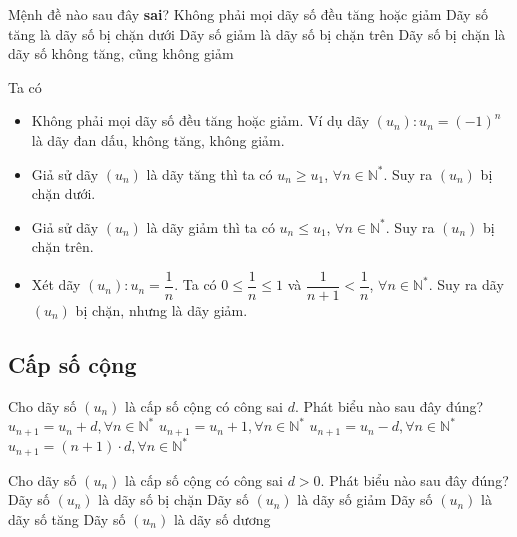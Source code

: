 \begin{ex}%
	Mệnh đề nào sau đây \textbf{sai}?
	\choice
	{Không phải mọi dãy số đều tăng hoặc giảm}
	{Dãy số tăng là dãy số bị chặn dưới}
	{Dãy số giảm là dãy số bị chặn trên}
	{\True Dãy số bị chặn là dãy số không tăng, cũng không giảm}
	\loigiai
	{Ta có
		\begin{itemize}
			\item Không phải mọi dãy số đều tăng hoặc giảm. Ví dụ dãy $(u_n)\colon u_n=(-1)^n$ là dãy đan dấu, không tăng, không giảm.
			\item Giả sử dãy $(u_n)$ là dãy tăng thì ta có $u_n\geq u_1$, $\forall n\in\mathbb{N^*}$. Suy ra $(u_n)$ bị chặn dưới.
			\item Giả sử dãy $(u_n)$ là dãy giảm thì ta có $u_n\leq u_1$, $\forall n\in\mathbb{N^*}$. Suy ra $(u_n)$ bị chặn trên.
			\item Xét dãy $(u_n): u_n=\dfrac{1}{n}$. Ta có $0\leq\dfrac{1}{n}\leq 1$ và $\dfrac{1}{n+1}<\dfrac{1}{n}$, $\forall n\in\mathbb{N^*}$. Suy ra dãy $(u_n)$ bị chặn, nhưng là dãy giảm.
		\end{itemize}
	}
\end{ex}

\subsection{Cấp số cộng}
\begin{ex}%
	Cho dãy số $(u_n)$ là cấp số cộng có công sai $d$. Phát biểu nào sau đây đúng?
	\choice
	{\True $u_{n+1}=u_n +d, \forall n \in \mathbb{N^*}$}
	{$u_{n+1}=u_n +1, \forall n \in \mathbb{N^*}$}
	{$u_{n+1}=u_n -d, \forall n \in \mathbb{N^*}$}
	{$u_{n+1}= (n+1) \cdot d, \forall n \in \mathbb{N^*}$}
\end{ex}

\begin{ex}%
	Cho dãy số $(u_n)$ là cấp số cộng có công sai $d>0$. Phát biểu nào sau đây đúng?
	\choice
	{Dãy số $(u_n)$ là dãy số bị chặn}
	{Dãy số $(u_n)$ là dãy số giảm}
	{\True Dãy số $(u_n)$ là dãy số tăng}
	{Dãy số $(u_n)$ là dãy số dương}
\end{ex}

